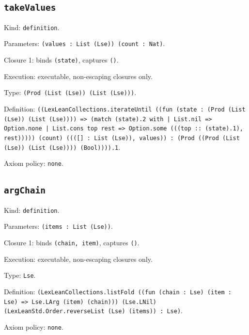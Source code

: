 \documentclass[11pt]{article}
\begin{document}
\subsection*{\texttt{takeValues}}
\noindent Kind: \texttt{definition}.\par
\noindent Parameters: \texttt{(values : List (Lse)) (count : Nat)}.\par
\noindent Closure 1: binds \texttt{(state)}, captures \texttt{()}.\par
\noindent Execution: executable, non-escaping closures only.\par
\noindent Type: \texttt{(Prod (List (Lse)) (List (Lse)))}.\par
\noindent Definition: \texttt{((LexLeanCollections.iterateUntil ((fun (state : (Prod (List (Lse)) (List (Lse)))) => (match (state).2 with | List.nil => Option.none | List.cons top rest => Option.some (((top :: (state).1), rest))))) (count) ((([] : List (Lse)), values)) : (Prod ((Prod (List (Lse)) (List (Lse)))) (Bool)))).1}.\par
\noindent Axiom policy: \texttt{none}.\par
\subsection*{\texttt{argChain}}
\noindent Kind: \texttt{definition}.\par
\noindent Parameters: \texttt{(items : List (Lse))}.\par
\noindent Closure 1: binds \texttt{(chain, item)}, captures \texttt{()}.\par
\noindent Execution: executable, non-escaping closures only.\par
\noindent Type: \texttt{Lse}.\par
\noindent Definition: \texttt{(LexLeanCollections.listFold ((fun (chain : Lse) (item : Lse) => Lse.LArg (item) (chain))) (Lse.LNil) (LexLeanStd.Order.reverseList (Lse) (items)) : Lse)}.\par
\noindent Axiom policy: \texttt{none}.\par
\end{document}
